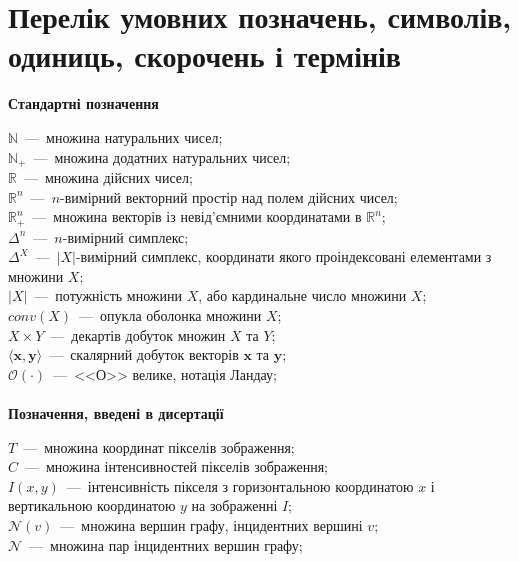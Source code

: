 \chapter*{Перелік умовних позначень, символів, одиниць, скорочень і термінів}

\textbf{Стандартні позначення}

 \noindent$\mathbb{N}$~---~множина натуральних чисел; \\
 \noindent$\mathbb{N}_+$~---~множина додатних натуральних чисел; \\
 \noindent$\mathbb{R}$~---~множина дійсних чисел; \\
 \noindent$\mathbb{R}^n$~---~$n$-вимірний векторний простір над полем дійсних чисел; \\
 \noindent$\mathbb{R}_+^n$~---~множина векторів із невід'ємними координатами в $\mathbb{R}^n$; \\
 \noindent$\Delta^n$~---~$n$-вимірний симплекс; \\
 \noindent$\Delta^X$~---~$\left| X \right|$-вимірний симплекс, координати якого проіндексовані елементами з множини $X$; \\
 \noindent$\left| X \right| $~---~потужність множини $X$, або кардинальне число множини $X$; \\
 \noindent$conv \left( X \right)$~---~опукла оболонка множини $X$; \\
 \noindent$X \times Y$~---~декартів добуток множин $X$ та $Y$; \\
 \noindent$\langle \pmb{x}, \pmb{y} \rangle$~---~скалярний добуток векторів $\pmb{x}$ та $\pmb{y}$; \\
 \noindent$\mathcal{O} \left( \cdot \right)$~---~<<О>> велике, нотація Ландау;
\\
\\
\textbf{Позначення, введені в дисертації}

 \noindent$T$~---~множина координат пікселів зображення; \\
 \noindent$C$~---~множина інтенсивностей пікселів зображення; \\
 \noindent$I \left( x, y \right)$~---~інтенсивність пікселя з горизонтальною координатою $x$ і вертикальною координатою $y$ на зображенні $I$; \\
 \noindent$\mathcal{N} \left( v \right)$~---~множина вершин графу, інцидентних вершині $v$; \\
 \noindent$\mathcal{N}$~---~множина пар інцидентних вершин графу;
